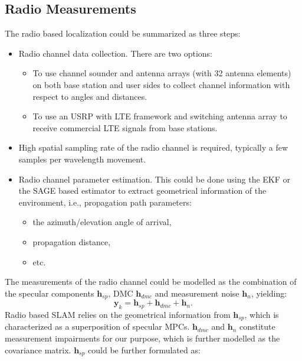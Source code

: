 \subsection{Radio Measurements}\label{sec:radio_measurements}


The radio based localization could be summarized as three steps:

\begin{itemize}
\item Radio channel data collection. There are two options:
  \begin{itemize}
  \item To use channel sounder and antenna arrays (with 32 antenna
    elements) on both base station and user sides to collect channel
    information with respect to angles and distances.
  \item To use an \gls{USRP} with \gls{LTE} framework and switching antenna array to
  receive commercial \gls{LTE} signals from base stations.
\end{itemize}
\item  High spatial sampling rate of the radio channel is required, typically a few samples per wavelength movement.
\item Radio channel parameter estimation. This could be done using the \gls{EKF} or the
\gls{SAGE} based estimator
to extract geometrical information of the environment, i.e., propagation path
parameters:
\begin{itemize}
\item the azimuth/elevation angle of arrival,
\item propagation
distance,
\item etc.
\end{itemize}
\end{itemize}

The measurements of the radio channel could be modelled as the
combination of the specular components $ \mathbf{h}_{sp} $, \gls{DMC}
$ \mathbf{h}_{dmc} $ and measurement noise $
\mathbf{h}_n $, yielding:
\begin{equation}
\mathbf{y}_k = \mathbf{h}_{sp} + \mathbf{h}_{dmc} + \mathbf{h}_n.
\label{eq:channelmodel}
\end{equation}
Radio based SLAM relies on the geometrical information from $
\mathbf{h}_{sp} $, which is characterized as a superposition of
specular \gls{MPC}s. $ \mathbf{h}_{dmc} $ and $ \mathbf{h}_n $
constitute measurement impairments for our purpose, which is further
modelled as the covariance matrix. $ \mathbf{h}_{sp} $ could be
further formulated as:


